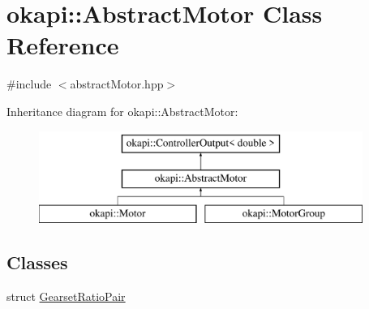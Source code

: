 \hypertarget{classokapi_1_1AbstractMotor}{}\section{okapi\+::Abstract\+Motor Class Reference}
\label{classokapi_1_1AbstractMotor}


{\ttfamily \#include $<$abstract\+Motor.\+hpp$>$}

Inheritance diagram for okapi\+::Abstract\+Motor\+:\begin{figure}[H]
\begin{center}
\leavevmode
\includegraphics[height=3.000000cm]{classokapi_1_1AbstractMotor}
\end{center}
\end{figure}
\subsection*{Classes}
\begin{DoxyCompactItemize}
\item 
struct \mbox{\hyperlink{structokapi_1_1AbstractMotor_1_1GearsetRatioPair}{Gearset\+Ratio\+Pair}}
\end{DoxyCompactItemize}
